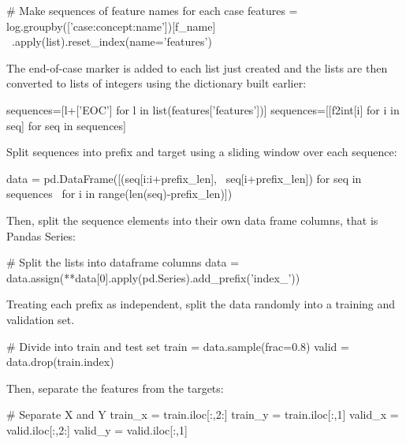 \begin{samepage}
\begin{pythoncode}
# Make sequences of feature names for each case
features = log.groupby(['case:concept:name'])[f_name] \
    .apply(list).reset_index(name='features')
\end{pythoncode}
\end{samepage}

The end-of-case marker is added to each list just created and the lists are then converted to lists of integers using the dictionary built earlier:

\begin{samepage}
\begin{pythoncode}
sequences=[l+['EOC'] for l in list(features['features'])]
sequences=[[f2int[i] for i in seq] for seq in sequences]
\end{pythoncode}
\end{samepage}

Split sequences into prefix and target using a sliding window over each sequence:
\begin{samepage}
\begin{pythoncode}
data = pd.DataFrame([(seq[i:i+prefix_len], \
    seq[i+prefix_len]) for seq in sequences \
    for i in range(len(seq)-prefix_len)])
\end{pythoncode}
\end{samepage}

Then, split the sequence elements into their own data frame columns, that is Pandas Series:

\begin{samepage}
\begin{pythoncode}
# Split the lists into dataframe columns
data = data.assign(**data[0].apply(pd.Series).add_prefix('index_'))
\end{pythoncode}
\end{samepage}

Treating each prefix as independent, split the data randomly into a training and validation set. 

\begin{samepage}
\begin{pythoncode}
# Divide into train and test set
train = data.sample(frac=0.8)
valid = data.drop(train.index)
\end{pythoncode}
\end{samepage}

Then, separate the features from the targets:

\begin{samepage}
\begin{pythoncode}
# Separate X and Y
train_x = train.iloc[:,2:]
train_y = train.iloc[:,1]
valid_x = valid.iloc[:,2:]
valid_y = valid.iloc[:,1]
\end{pythoncode}
\end{samepage}

